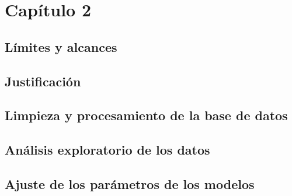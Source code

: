 \newpage

\begin{center}
\vspace*{15em}
{\huge\bfseries\color{blue}{Capítulo 2}\par}
{\huge\bfseries\color{blue}{Segundo Capítulo}\par}
\end{center}
\chapter{Capítulo 2}
\section{Límites y alcances}
\section{Justificación}
\section{Limpieza y procesamiento de la base de datos}
\section{Análisis exploratorio de los datos}
\section{Ajuste de los parámetros de los modelos}
